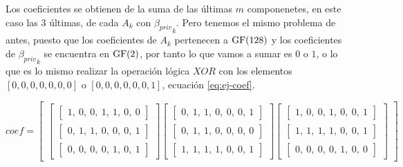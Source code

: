 Los coeficientes se obtienen de la suma de las últimas $m$ componenetes, en este caso las $3$ últimas, de cada $A_k$ con ${\beta_{priv}}_k$. Pero tenemos el mismo problema de antes, puesto que los coeficientes de $A_k$ pertenecen a $\operatorname{GF}(128)$ y los coeficientes de ${\beta_{priv}}_k$ se encuentra en $\operatorname{GF}(2)$, por tanto lo que vamos a sumar es $0$ o $1$, o lo que es lo mismo realizar la operación lógica $XOR$ con los elementos $[0,0,0,0,0,0,0]$ o $[0,0,0,0,0,0,1]$, ecuación \ref{eq:ej-coef}.

\begin{equation}\label{eq:ej-coef}
	{coef} =
	\left[\begin{array}{c}
		\left[\begin{array}{c}
			\left[\begin{array}{c}1,\ 0,\ 0,\ 1,\ 1,\ 0,\ 0\end{array}\right]\\
			\left[\begin{array}{c}0,\ 1,\ 1,\ 0,\ 0,\ 0,\ 1\end{array}\right]\\
			\left[\begin{array}{c}0,\ 0,\ 0,\ 0,\ 1,\ 0,\ 1\end{array}\right]
		\end{array}\right]
		\left[\begin{array}{c}
			\left[\begin{array}{c}0,\ 1,\ 1,\ 0,\ 0,\ 0,\ 1\end{array}\right]\\
			\left[\begin{array}{c}0,\ 1,\ 1,\ 0,\ 0,\ 0,\ 0\end{array}\right]\\
			\left[\begin{array}{c}1,\ 1,\ 1,\ 1,\ 0,\ 0,\ 1\end{array}\right]
		\end{array}\right]
		\left[\begin{array}{c}
			\left[\begin{array}{c}1,\ 0,\ 0,\ 1,\ 0,\ 0,\ 1\end{array}\right]\\
			\left[\begin{array}{c}1,\ 1,\ 1,\ 1,\ 0,\ 0,\ 1\end{array}\right]\\
			\left[\begin{array}{c}0,\ 0,\ 0,\ 0,\ 1,\ 0,\ 0\end{array}\right]
		\end{array}\right]
	\end{array}\right]
\end{equation}

